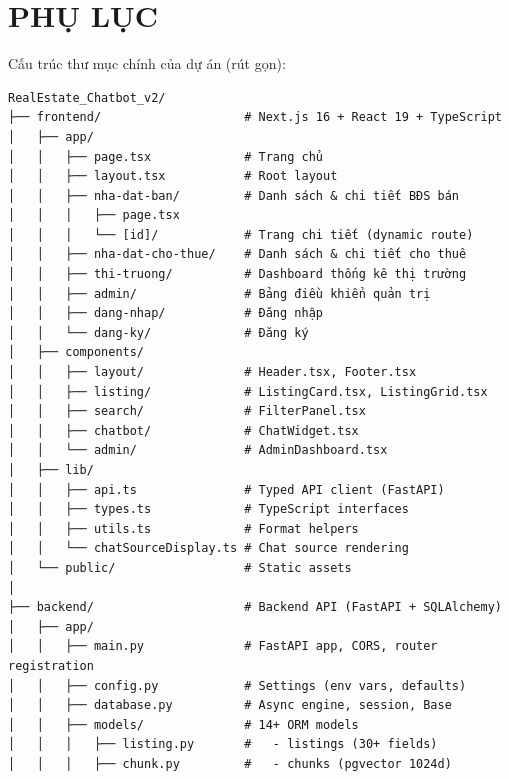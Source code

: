 \chapter*{PHỤ LỤC}

\vspace{0.5cm}


\vspace{0.3cm}

Cấu trúc thư mục chính của dự án (rút gọn):

\begin{lstlisting}[basicstyle=\ttfamily\footnotesize]
RealEstate_Chatbot_v2/
├── frontend/                    # Next.js 16 + React 19 + TypeScript
│   ├── app/
│   │   ├── page.tsx             # Trang chủ
│   │   ├── layout.tsx           # Root layout
│   │   ├── nha-dat-ban/         # Danh sách & chi tiết BĐS bán
│   │   │   ├── page.tsx
│   │   │   └── [id]/            # Trang chi tiết (dynamic route)
│   │   ├── nha-dat-cho-thue/    # Danh sách & chi tiết cho thuê
│   │   ├── thi-truong/          # Dashboard thống kê thị trường
│   │   ├── admin/               # Bảng điều khiển quản trị
│   │   ├── dang-nhap/           # Đăng nhập
│   │   └── dang-ky/             # Đăng ký
│   ├── components/
│   │   ├── layout/              # Header.tsx, Footer.tsx
│   │   ├── listing/             # ListingCard.tsx, ListingGrid.tsx
│   │   ├── search/              # FilterPanel.tsx
│   │   ├── chatbot/             # ChatWidget.tsx
│   │   └── admin/               # AdminDashboard.tsx
│   ├── lib/
│   │   ├── api.ts               # Typed API client (FastAPI)
│   │   ├── types.ts             # TypeScript interfaces
│   │   ├── utils.ts             # Format helpers
│   │   └── chatSourceDisplay.ts # Chat source rendering
│   └── public/                  # Static assets
│
├── backend/                     # Backend API (FastAPI + SQLAlchemy)
│   ├── app/
│   │   ├── main.py              # FastAPI app, CORS, router registration
│   │   ├── config.py            # Settings (env vars, defaults)
│   │   ├── database.py          # Async engine, session, Base
│   │   ├── models/              # 14+ ORM models
│   │   │   ├── listing.py       #   - listings (30+ fields)
│   │   │   ├── chunk.py         #   - chunks (pgvector 1024d)

\end{lstlisting}
